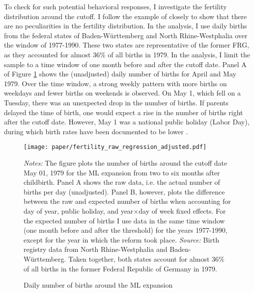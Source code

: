 To check for such potential behavioral responses, I investigate the fertility distribution around the cutoff. I follow the example of \cite{gans2009born} closely to show that there are no peculiarities in the fertility distribution. In the analysis, I use daily births from the federal states of Baden-Württemberg and North Rhine-Westphalia over the window of 1977-1990. These two states are representative of the former FRG, as they accounted for almost 36\% of all births in 1979. In the analysis, I limit the sample to a time window of one month before and after the cutoff date. Panel A of Figure \ref{fig_mlch: fertilitydistr} shows the (unadjusted) daily number of births for April and May 1979. Over the time window, a strong weekly pattern with more births on weekdays and fewer births on weekends is observed. On May 1, which fell on a Tuesday, there was an unexpected drop in the number of births. If parents delayed the time of birth, one would expect a rise in the number of births right after the cutoff date. However, May 1 was a national public holiday (Labor Day), during which birth rates have been documented to be lower \citep{neugart2013economic}.

\begin{figure}[H]\centering
	\caption{Daily number of births around the ML expansion}\label{fig_mlch: fertilitydistr}
	\texttt{[image: paper/fertility\_raw\_regression\_adjusted.pdf]}
	\scriptsize
	\begin{minipage}{0.9 \linewidth}
		\emph{Notes:} The figure plots the number of births around the cutoff date May 01, 1979 for the ML expansion from two to six months after childbirth. Panel A shows the raw data, i.e. the actual number of births per day (unadjusted). Panel B, however, plots the difference between the raw and expected number of births when accounting for day of year, public holiday, and year$\times$day of week fixed effects. For the expected number of births I use data in the same time window (one month before and after the threshold) for the years 1977-1990, except for the year in which the reform took place. \newline\emph{Source:} Birth registry data from North Rhine-Westphalia and Baden-Württemberg. Taken together, both states account for almost 36\% of all births in the former Federal Republic of Germany in 1979.
	\end{minipage}
\end{figure}


